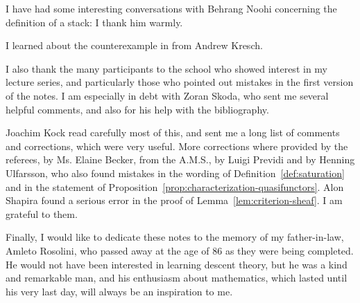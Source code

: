 \begin{0   INTRODUCTION}
 I have had some interesting conversations with Behrang Noohi concerning the definition of a stack: I thank him warmly.
 
I learned about the counterexample in \cite[XII 3.2]{raynaudample} from Andrew Kresch.

I also thank the many participants to the school who showed interest in my lecture series, and particularly those who pointed out mistakes in the first version of the notes. I am especially in debt with Zoran Skoda, who sent me several helpful comments, and also for his help with the bibliography.

Joachim Kock read carefully most of this, and sent me a long list of comments and corrections, which were very useful. More corrections where provided by the referees, by Ms. Elaine Becker, from the A.M.S., by Luigi Previdi and by Henning Ulfarsson, who also found mistakes in the wording of Definition~\ref{def:saturation} and in the statement of Proposition~\ref{prop:characterization-quasifunctors}. Alon Shapira found a serious error in the proof of Lemma~\ref{lem:criterion-sheaf}. I am grateful to them.

Finally, I would like to dedicate these notes to the memory of my father-in-law, Amleto Rosolini, who passed away at the age of 86 as they were being completed. He would not have been interested in learning descent theory, but he was a kind and remarkable man, and his enthusiasm about mathematics, which lasted until his very last day, will always be an inspiration to me.


\end{0   INTRODUCTION}
